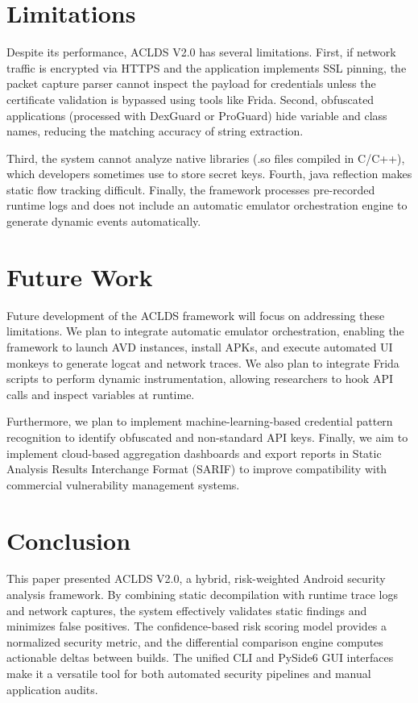 \documentclass[conference]{
IEEEtran}
\begin{document}
\section{Limitations}
Despite its performance, ACLDS V2.0 has several limitations. First, if network traffic is encrypted via HTTPS and the application implements SSL pinning, the packet capture parser cannot inspect the payload for credentials unless the certificate validation is bypassed using tools like Frida. Second, obfuscated applications (processed with DexGuard or ProGuard) hide variable and class names, reducing the matching accuracy of string extraction.

Third, the system cannot analyze native libraries (.so files compiled in C/C++), which developers sometimes use to store secret keys. Fourth, java reflection makes static flow tracking difficult. Finally, the framework processes pre-recorded runtime logs and does not include an automatic emulator orchestration engine to generate dynamic events automatically.

\section{Future Work}
Future development of the ACLDS framework will focus on addressing these limitations. We plan to integrate automatic emulator orchestration, enabling the framework to launch AVD instances, install APKs, and execute automated UI monkeys to generate logcat and network traces. We also plan to integrate Frida scripts to perform dynamic instrumentation, allowing researchers to hook API calls and inspect variables at runtime.

Furthermore, we plan to implement machine-learning-based credential pattern recognition to identify obfuscated and non-standard API keys. Finally, we aim to implement cloud-based aggregation dashboards and export reports in Static Analysis Results Interchange Format (SARIF) to improve compatibility with commercial vulnerability management systems.

\section{Conclusion}
This paper presented ACLDS V2.0, a hybrid, risk-weighted Android security analysis framework. By combining static decompilation with runtime trace logs and network captures, the system effectively validates static findings and minimizes false positives. The confidence-based risk scoring model provides a normalized security metric, and the differential comparison engine computes actionable deltas between builds. The unified CLI and PySide6 GUI interfaces make it a versatile tool for both automated security pipelines and manual application audits.
\end{document}
